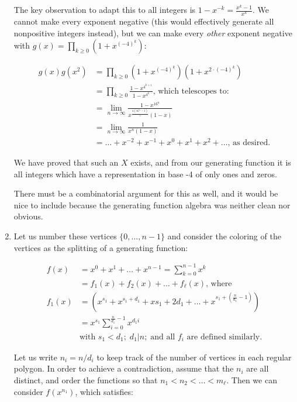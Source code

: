 \documentclass{book}
\numberwithin{equation}{section}
\begin{document}
\begin{enumerate}[label={8.\arabic*}]
The key observation to adapt this to all integers is $1 - x^{-k} = \frac{x^k - 1}{x^k}$. We cannot make every
exponent negative (this would effectively generate all nonpositive integers instead), but we can make every
\emph{other} exponent negative with $g(x) = \prod_{k \geq 0}(1+x^{(-4)^k})$:

\begin{align*}
g(x)g(x^2) & = \prod_{k \geq 0}(1+x^{(-4)^k})(1 + x^{2\cdot(-4)^k}) \\
& = \prod_{k \geq 0}\frac{1-x^{4^{k+1}}}{1-x^{4^k}}\text{, which telescopes to:} \\
& = \lim_{n \to \infty} \frac{1 - x^{16^n}}{x^{\frac{4(16^n - 1)}{5}}(1-x)} \\
& = \lim_{n \to \infty} \frac{1}{x^n (1-x)} \\
& = \ldots + x^{-2} + x^{-1} + x^0 + x^1 + x^2 + \ldots \text{, as desired.}
\end{align*}

We have proved that such an $X$ exists, and from our generating function it is all integers which have a
representation in base -4 of only ones and zeros.

There must be a combinatorial argument for this as well, and it would be nice to include because the 
generating function algebra was neither clean nor obvious.

\item
Let us number these vertices $\{0, \ldots, n-1\}$ and consider the coloring of the vertices as the splitting
of a generating function:

\begin{align*}
f(x) & = x^0 + x^1 + \ldots + x^{n-1} = \sum_{k=0}^{n-1}x^k \\
& = f_1(x) + f_2(x) + \ldots + f_\ell(x) \text{, where} \\
f_1(x) & = \left(x^{s_1} + x^{s_1 + d_1} + x{s_1 + 2d_1} + \ldots + x^{s_1 + \left(\frac{n}{d_1} - 1\right)}\right) \\
& = x^{s_1}\sum_{i=0}^{\frac{n}{d_1}-1} x^{d_1 i} \\
& \text{with } s_1 < d_1 ; \; d_1 | n ; \; \text{and all }f_i\text{ are defined similarly.}
\end{align*}

Let us write $n_i = n/d_i$ to keep track of the number of vertices in each regular polygon.
In order to achieve a contradiction, assume that the $n_i$ are all distinct, and order
the functions so that $n_1 < n_2 < \ldots < m_\ell$. Then we can consider $f(x^{n_1})$, which satisfies:


\end{enumerate}
\end{document}
